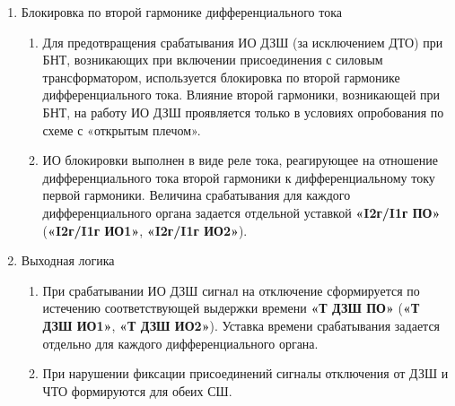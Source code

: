 \begin{enumerate}
\begin{enumerate}
\item
Очувствление представляет собой автоматическую смену величины начального тока срабатывания тормозной характеристики на более чувствительную уставку. Для каждого дифференциального органа параметры тормозной характеристики в режиме очувствления задаются отдельными уставками. Подробное описание алгоритма очувствления приведен в разделе «Логика очувствления».

\end{enumerate}


\item Блокировка по второй гармонике дифференциального тока

\begin{enumerate}

\item
Для предотвращения срабатывания ИО ДЗШ (за исключением ДТО) при БНТ, возникающих при включении присоединения с силовым трансформатором, используется блокировка по второй гармонике дифференциального тока.
Влияние второй гармоники, возникающей при БНТ, на работу ИО ДЗШ проявляется только в условиях опробования по схеме с «открытым плечом».

\item
ИО блокировки выполнен в виде реле тока, реагирующее на отношение дифференциального тока второй гармоники к дифференциальному току первой гармоники. Величина срабатывания для каждого дифференциального органа задается отдельной уставкой \textbf{«I2г/I1г ПО»} (\textbf{«I2г/I1г ИО1»}, \textbf{«I2г/I1г ИО2»}).
\end{enumerate}

\item Выходная логика

\begin{enumerate}

\item
При срабатывании ИО ДЗШ сигнал на отключение сформируется по истечению соответствующей выдержки времени \textbf{«Т ДЗШ ПО»} (\textbf{«Т ДЗШ ИО1»}, \textbf{«Т ДЗШ ИО2»}). Уставка времени срабатывания задается отдельно для каждого дифференциального органа.

\item
При нарушении фиксации присоединений сигналы отключения от ДЗШ и ЧТО формируются для обеих СШ.


\end{enumerate}
\end{enumerate}
